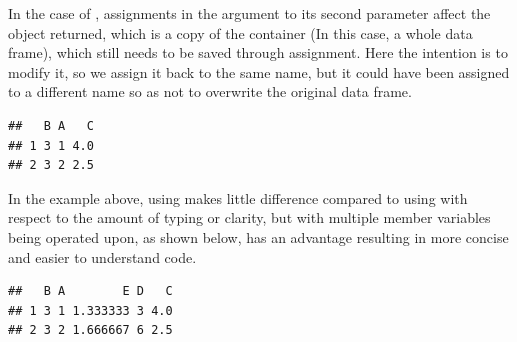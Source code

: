 \documentclass[krantz2]{krantz}\usepackage{knitr}
\begin{document}
In the case of , assignments in the argument to its second parameter affect the object returned, which is a copy of the container (In this case, a whole data frame), which still needs to be saved through assignment. Here the intention is to modify it, so we assign it back to the same name, but it could have been assigned to a different name so as not to overwrite the original data frame.

\begin{knitrout}\footnotesize
{}\color{fgcolor}\begin{kframe}
\begin{alltt}
\hlopt{$} \hlkwb{<-} 
 \hlkwb{<-}  \hlkwb{<-}  \hlopt{+}  \hlopt{/} 
 \hlstd{)}
\end{alltt}
\begin{verbatim}
##   B A   C
## 1 3 1 4.0
## 2 3 2 2.5
\end{verbatim}
\end{kframe}
\end{knitrout}

In the example above, using  makes little difference compared to using  with respect to the amount of typing or clarity, but with multiple member variables being operated upon, as shown below,  has an advantage resulting in more concise and easier to understand code.

\begin{knitrout}\footnotesize
{}\color{fgcolor}\begin{kframe}
\begin{alltt}
\hlopt{$} \hlkwb{<-} 
 \hlkwb{<-} 
                            \hlkwb{<-}  \hlopt{+}  \hlopt{/} 
                             \hlkwb{<-}  \hlopt{*} 
                             \hlkwb{<-}  \hlopt{/}  \hlopt{+} \hlstd{\}}
                           \hlstd{)}
 \hlstd{)}
\end{alltt}
\begin{verbatim}
##   B A        E D   C
## 1 3 1 1.333333 3 4.0
## 2 3 2 1.666667 6 2.5
\end{verbatim}
\end{kframe}
\end{knitrout}
\end{document}
